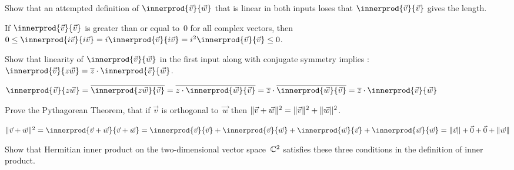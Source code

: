 \begin{exercises}
\item
Show that an attempted definition of $\innerprod{\vec{v}}{\vec{w}}$
that is linear in both inputs
loses that $\innerprod{\vec{v}}{\vec{v}}$ gives the length.
\begin{answer}
If
$\innerprod{\vec{v}}{\vec{v}}$ is greater than or equal to~$0$ for all
complex vectors,
then 
$0\leq \innerprod{i\vec{v}}{i\vec{v}}
  =i\innerprod{\vec{v}}{i\vec{v}}
  =i^2\innerprod{\vec{v}}{\vec{v}}\leq 0$.
\end{answer}

\item Show that linearity of $\innerprod{\vec{v}}{\vec{w}}$ in the first
input along with conjugate symmetry implies 
:
$\innerprod{\vec{v}}{z\vec{w}}=\compconj{z}\cdot \innerprod{\vec{v}}{\vec{w}}$.
\begin{answer}
$\innerprod{\vec{v}}{z\vec{w}}
=\compconj{\innerprod{z\vec{w}}{\vec{v}}}
=\compconj{z\cdot\innerprod{\vec{w}}{\vec{v}}}
=\compconj{z}\cdot\compconj{\innerprod{\vec{w}}{\vec{v}}}
=
\compconj{z}\cdot \innerprod{\vec{v}}{\vec{w}}$
\end{answer}

\item Prove the Pythagorean Theorem,  
that if $\vec{v}$ is orthogonal to~$\vec{w}$ then 
$\lVert\vec{v}+\vec{w}\rVert^2=\lVert\vec{v}\rVert^2+\lVert\vec{w}\rVert^2$.
\begin{answer}
$
\norm{\vec{v}+\vec{w}}^2
=\innerprod{\vec{v}+\vec{w}}{\vec{v}+\vec{w}}
=\innerprod{\vec{v}}{\vec{v}}
  +\innerprod{\vec{v}}{\vec{w}}
  +\innerprod{\vec{w}}{\vec{v}}
  +\innerprod{\vec{w}}{\vec{w}}
=\norm{\vec{v}}
  +\zero
  +\zero
  +\norm{\vec{w}}
$
\end{answer}

\item
Show that Hermitian inner product on the two-dimensional vector space~$\mathbb{C}^2$ 
satisfies these three conditions in the definition of inner product. 


\end{exercises}
\endinput
% 